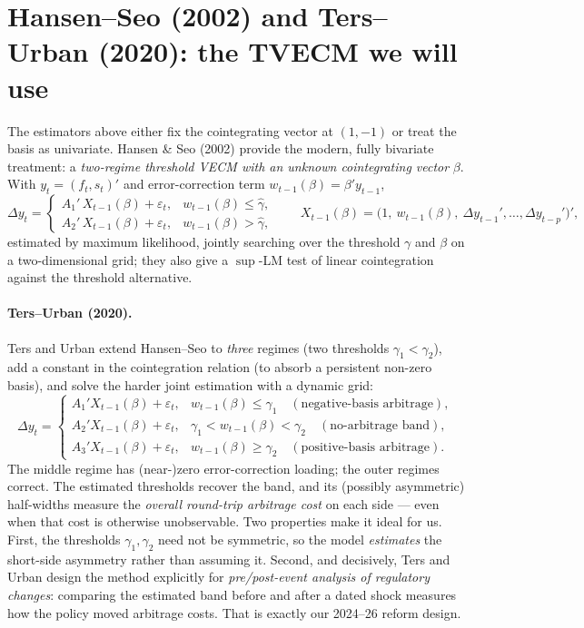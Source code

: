 \section{Hansen--Seo (2002) and Ters--Urban (2020): the TVECM we will use}
\label{sec:tvecm}
The estimators above either fix the cointegrating vector at $(1,-1)$ or treat the basis as univariate. Hansen \& Seo (2002) provide the modern, fully bivariate treatment: a \emph{two-regime threshold VECM with an unknown cointegrating vector} $\beta$. With $y_t=(f_t,s_t)'$ and error-correction term $w_{t-1}(\beta)=\beta' y_{t-1}$,
\begin{equation}
\Delta y_t = \begin{cases} A_1'\,X_{t-1}(\beta) + \varepsilon_t, & w_{t-1}(\beta)\le \hat\gamma,\\[3pt] A_2'\,X_{t-1}(\beta) + \varepsilon_t, & w_{t-1}(\beta) > \hat\gamma, \end{cases} \qquad X_{t-1}(\beta)=\big(1,\ w_{t-1}(\beta),\ \Delta y_{t-1}',\dots,\Delta y_{t-p}'\big)', \label{eq:hansenseo}
\end{equation}
estimated by maximum likelihood, jointly searching over the threshold $\gamma$ and $\beta$ on a two-dimensional grid; they also give a $\sup$-LM test of linear cointegration against the threshold alternative.

\paragraph{Ters--Urban (2020).} Ters and Urban extend Hansen--Seo to \emph{three} regimes (two thresholds $\gamma_1<\gamma_2$), add a constant in the cointegration relation (to absorb a persistent non-zero basis), and solve the harder joint estimation with a dynamic grid:
\begin{equation}
\Delta y_t = \begin{cases} A_1' X_{t-1}(\beta) + \varepsilon_t, & w_{t-1}(\beta) \le \gamma_1 \quad(\text{negative-basis arbitrage}),\\[3pt] A_2' X_{t-1}(\beta) + \varepsilon_t, & \gamma_1 < w_{t-1}(\beta) < \gamma_2 \quad(\text{no-arbitrage band}),\\[3pt] A_3' X_{t-1}(\beta) + \varepsilon_t, & w_{t-1}(\beta) \ge \gamma_2 \quad(\text{positive-basis arbitrage}). \end{cases} \label{eq:tersurban}
\end{equation}
The middle regime has (near-)zero error-correction loading; the outer regimes correct. The estimated thresholds recover the band, and its (possibly asymmetric) half-widths measure the \emph{overall round-trip arbitrage cost} on each side --- even when that cost is otherwise unobservable. Two properties make it ideal for us. First, the thresholds $\gamma_1,\gamma_2$ need not be symmetric, so the model \emph{estimates} the short-side asymmetry rather than assuming it. Second, and decisively, Ters and Urban design the method explicitly for \emph{pre/post-event analysis of regulatory changes}: comparing the estimated band before and after a dated shock measures how the policy moved arbitrage costs. That is exactly our 2024--26 reform design.

